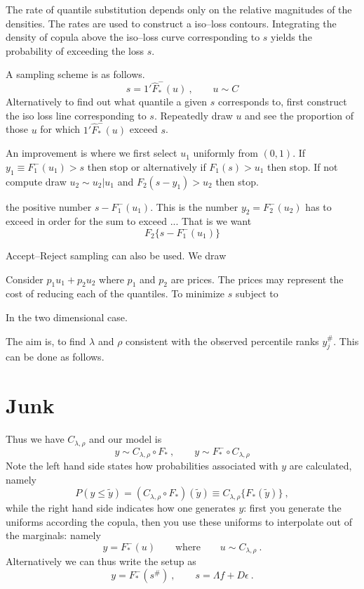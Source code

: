 \documentclass[a4paper,12pt]{article}
\newcommand{\eps}{\epsilon}
\begin{document}
The rate of quantile substitution depends only on the relative magnitudes of the densities.  The rates are used to construct a iso--loss contours.   Integrating the density of copula above the iso--loss curve corresponding to $s$ yields the probability of exceeding the loss $s$.

A sampling scheme is as follows.
$$
s=1'\hat F_*^-(u)\ , \qquad u\sim C
$$
Alternatively to find out what quantile a given $s$ corresponds to, first construct the iso loss line corresponding to $s$.   Repeatedly draw $u$ and see the proportion of those $u$ for which $1'\hat F_*^-(u)$ exceed $s$.

An improvement is where we first select $u_1$ uniformly from $(0,1)$.   If $y_1\equiv F_1^-(u_1)>s$ then stop or alternatively if $F_1(s)>u_1$ then stop.  If not compute draw $u_2\sim u_2|u_1$ and $F_2(s-y_1)>u_2$ then stop.

the positive number $s-F_1^-(u_1)$.  This is the number $y_2=F_2^-(u_2)$ has to exceed in order for the sum to exceed ...   That is we want
$$
F_2\{s-F_1^-(u_1)\}
$$

Accept--Reject sampling can also be used.   We draw


Consider $p_1u_1+p_2u_2$ where $p_1$ and $p_2$ are prices.  The prices may represent the cost of reducing each of the quantiles.   To minimize $s$ subject to





In the two dimensional case.


The aim is, to find $\lambda$ and $\rho$  consistent with the observed percentile ranks $y_j^\#$.   This can be done as follows.




\section{Junk}
Thus we have $C_{\lambda,\rho}$ and our model is
$$
y\sim C_{\lambda,\rho}\circ F_*\ , \qquad y\sim F_*^-\circ C_{\lambda,\rho}
$$
Note the left hand side states how probabilities associated with $y$ are calculated, namely
$$
P(y\le\tilde y) = (C_{\lambda,\rho}\circ F_*)(\tilde y) \equiv C_{\lambda,\rho}\{F_*(\tilde y)\}\ ,
$$
while the right hand side indicates how one generates $y$: first you generate the uniforms according the copula, then you use these uniforms to interpolate out of the marginals: namely
$$
y = F_*^-(u)\qquad \mathrm{where}\qquad u\sim C_{\lambda,\rho}\ .
$$
Alternatively we can thus write the setup as
$$
y=F_*^-(s^\#)\ , \qquad s=\Lambda f + D\eps\ .
$$
\end{document}

